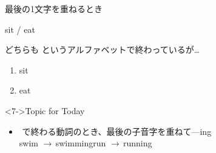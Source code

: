 \documentclass[aspectratio=169,xcolor={dvipsnames,table}]{beamer}
\begin{document}
\begin{frame}[plain]{最後の1文字を重ねるとき}
 \Large

sit / eat

どちらも\,\,というアルファベットで終わっているが\ldots

\bigskip

\begin{enumerate} 
 \item<2-> sit \,\,\,\,\,\,\,\,\,\,\,\,
 \item<2-> eat \,\,\,\,\,\,\,\,\,\,\,\hfill{}
\end{enumerate}

\bigskip
\begin{block}<7->{Topic for Today}\small
\begin{itemize}[square]
 \item {}\,\,で終わる動詞のとき、最後の子音字を重ねて---ing\,\,\dbend\,\,\dbend\\[5pt]
\hfill{swim $\rightarrow$\,swimming\hspace{15pt}run $\rightarrow$\,running}
\end{itemize}
\end{block}
\end{frame}
\end{document}
